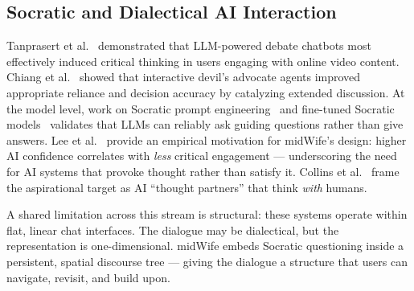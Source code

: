 \documentclass[sigconf]{acmart}
\begin{document}
\subsection{Socratic and Dialectical AI Interaction}
Tanprasert et al.~\cite{tanprasert2024debate} demonstrated that LLM-powered debate
chatbots most effectively induced critical thinking in users engaging with online video
content. Chiang et al.~\cite{chiang2024devilsadvocate} showed that interactive
devil's advocate agents improved appropriate reliance and decision accuracy by
catalyzing extended discussion. At the model level, work on Socratic prompt
engineering~\cite{chang2023socratic} and fine-tuned Socratic models~\cite{liu2024socraticlm}
validates that LLMs can reliably ask guiding questions rather than give answers.
Lee et al.~\cite{lee2025criticalthinking} provide an empirical motivation for
midWife's design: higher AI confidence correlates with \textit{less} critical
engagement --- underscoring the need for AI systems that provoke thought rather than
satisfy it. Collins et al.~\cite{collins2024thoughtpartners} frame the aspirational
target as AI ``thought partners'' that think \textit{with} humans.

A shared limitation across this stream is structural: these systems operate within
flat, linear chat interfaces. The dialogue may be dialectical, but the representation
is one-dimensional. midWife embeds Socratic questioning inside a persistent, spatial
discourse tree --- giving the dialogue a structure that users can navigate, revisit,
and build upon.

\end{document}
